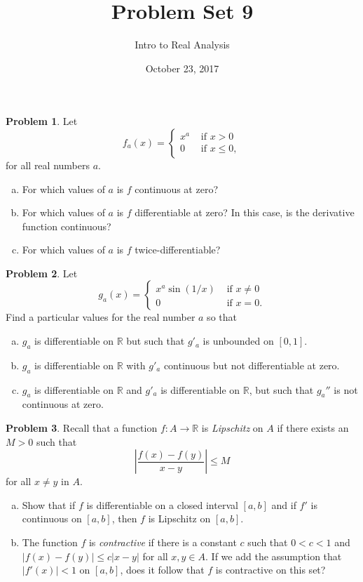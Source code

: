 \documentclass{amsart}
\newcommand{\+}[1]{\ensuremath{\mathbf{#1}}}
\newcommand{\R}{{\mathbb R}}
\theoremstyle{definition}
\newtheorem{prob}{Problem}
\begin{document}
\title{Problem Set 9}
\date{October 23, 2017}
\author{Intro to Real Analysis}

\maketitle

\begin{prob}
Let
\[f_a(x) =
\begin{cases}
x^a &\text{ if } x > 0\\
0 &\text{ if } x \leq 0,
\end{cases}
\]
for all real numbers $a$.
\begin{enumerate}[(a)]
 \item For which values of $a$ is $f$ continuous at zero?
 \item For which values of $a$ is $f$ differentiable at zero?
In this case, is the derivative function continuous?
\item For which values of $a$ is $f$ twice-differentiable?
\end{enumerate}
\end{prob}

\begin{prob}
 Let
 \[
g_a(x) =
\begin{cases}
x^a \sin(1/x) &\text{ if } x \neq 0\\
0 &\text{ if } x = 0.
\end{cases}
\]
Find a particular values for the real number $a$ so that
\begin{enumerate}[(a)]
 \item $g_a$ is differentiable on $\R$ but such that $g'_a$ is unbounded on $[0,1]$.
 \item $g_a$ is differentiable on $\R$ with $g'_a$ continuous but not differentiable at zero.
 \item $g_a$ is differentiable on $\R$ and $g'_a$ is differentiable on $\R$,
 but such that $g_a''$ is not continuous at zero.
\end{enumerate}
\end{prob}


\begin{prob}
 Recall that a function $f: A \to \R$ is \emph{Lipschitz} on $A$
 if there exists an $M > 0$ such that
 \[
 \left| \frac{f(x) - f(y)}{x-y} \right| \leq M
 \]
 for all $x \neq y$ in $A$.
 \begin{enumerate}[(a)]
  \item  Show that if $f$ is differentiable on a closed interval $[a,b]$
  and if $f'$ is continuous on $[a,b]$, then $f$ is Lipschitz on $[a,b]$.
  \item  The function $f$ is \emph{contractive} if there is a constant $c$
  such that $0<c<1$ and
  $|f(x) - f(y)| \leq c|x-y|$ for all $x,y \in A$.
  If we add the assumption that $|f'(x)| < 1$ on $[a,b]$, does
  it follow that $f$ is contractive on this set?
 \end{enumerate}
\end{prob}
\end{document}
